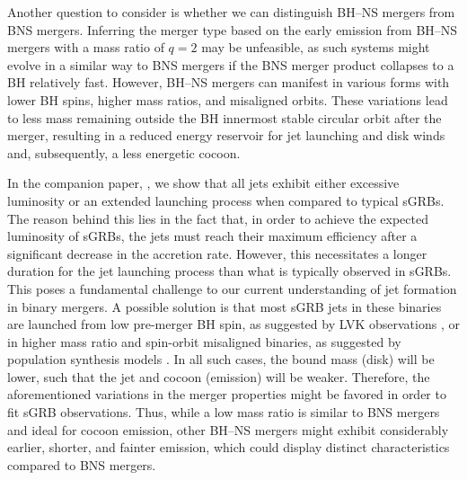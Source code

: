 \documentclass[twocolumn,dvipsnames]{aastex62}
\begin{document}
Another question to consider is whether we can distinguish BH--NS mergers from BNS mergers. Inferring the merger type based on the early emission from BH--NS mergers with a mass ratio of $ q = 2 $ may be unfeasible, as such systems might evolve in a similar way to BNS mergers if the BNS merger product collapses to a BH relatively fast.
However, BH--NS mergers can manifest in various forms with lower BH spins, higher mass ratios, and misaligned orbits. These variations lead to less mass remaining outside the BH innermost stable circular orbit after the merger, resulting in a reduced energy reservoir for jet launching and disk winds and, subsequently, a less energetic cocoon.

In the companion paper, \citet{Gottlieb2023}, we show that all jets exhibit either excessive luminosity or an extended launching process when compared to typical sGRBs. The reason behind this lies in the fact that, in order to achieve the expected luminosity of sGRBs, the jets must reach their maximum efficiency after a significant decrease in the accretion rate. However, this necessitates a longer duration for the jet launching process than what is typically observed in sGRBs. This poses a fundamental challenge to our current understanding of jet formation in binary mergers. A possible solution is that most sGRB jets in these binaries are launched from low pre-merger BH spin, as suggested by LVK observations \citep{Abbott2021}, or in higher mass ratio and spin-orbit misaligned binaries, as suggested by population synthesis models \citep{Belczynski2008}. In all such cases, the bound mass (disk) will be lower, such that the jet and cocoon (emission) will be weaker. Therefore, the aforementioned variations in the merger properties might be favored in order to fit sGRB observations. Thus, while a low mass ratio is similar to BNS mergers and ideal for cocoon emission, other BH--NS mergers might exhibit considerably earlier, shorter, and fainter emission, which could display distinct characteristics compared to BNS mergers.
\end{document}
